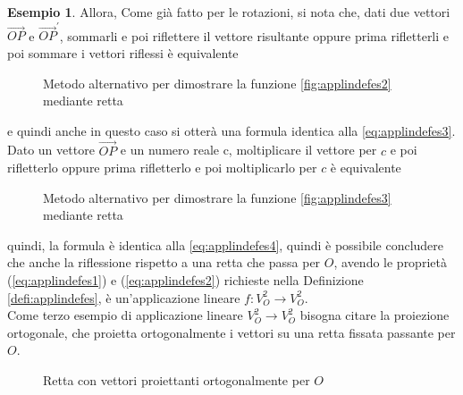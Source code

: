 \documentclass{book}
\theoremstyle{definition}
\newtheorem{es}{Esempio}[section]
\theoremstyle{plain}
\begin{document}
\begin{es}
  Allora, Come già fatto per le rotazioni, si nota che, dati due vettori
  $\vec{OP}$ e $\vec{OP}^\prime$, sommarli e poi riflettere il vettore
  risultante oppure prima rifletterli e poi sommare i vettori riflessi è
  equivalente
  \clearpage
  \begin{figure}[ht!]
    \centering
    \resizebox{7cm}{!}{}
    \caption{Metodo alternativo per dimostrare la funzione
      \ref{fig:applindefes2} mediante retta}
    \label{fig:applindefes5}
  \end{figure}
  e quindi anche in questo caso si otterà una formula identica alla
  \ref{eq:applindefes3}. Dato un vettore $\vec{OP}$ e un numero reale c,
  moltiplicare il vettore per $c$ e poi rifletterlo oppure prima
  rifletterlo e poi moltiplicarlo per $c$ è equivalente
  \begin{figure}[ht!]
    \centering
    \resizebox{7cm}{!}{}
    \caption{Metodo alternativo per dimostrare la funzione \ref{fig:applindefes3} mediante retta}
    \label{fig:applindefes6}
  \end{figure}

  quindi, la formula è identica alla \ref{eq:applindefes4}, quindi
  è possibile concludere che anche la riflessione rispetto a una retta che
  passa per $O$, avendo le proprietà (\ref{eq:applindefes1}) e
  (\ref{eq:applindefes2}) richieste nella Definizione
  \ref{defi:applindefes}, è un'applicazione lineare $f:V_O^2\to V_O^2$.\\
  Come terzo esempio di applicazione lineare $V_O^2\to V_O^2$ bisogna
  citare la proiezione ortogonale, che proietta ortogonalmente i vettori
  su una retta fissata passante per $O$.
  \begin{figure}[ht!]
    \centering
    \resizebox{8cm}{!}{}
    \caption{Retta con vettori proiettanti ortogonalmente per $O$}
    \label{fig:applindefes7}
  \end{figure}


\end{es}
\end{document}
